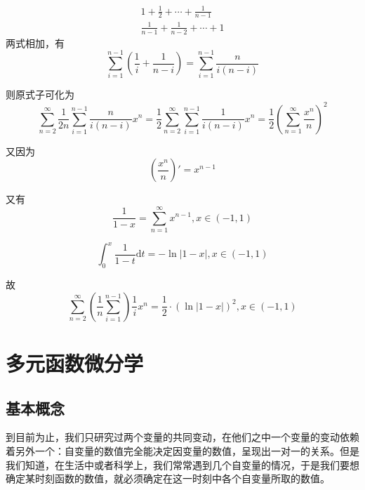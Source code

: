 \documentclass[lang=cn,10pt]{elegantbook}
\begin{document}
		\begin{equation*}
			\begin{split}
				1+\frac{1}{2}+\cdots +\frac{1}{n-1}\\
				\frac{1}{n-1}+\frac{1}{n-2}+\cdots+1
			\end{split}
		\end{equation*}
		两式相加，有
		\begin{equation*}
			\sum_{i=1}^{n-1 }(\frac{1}{i}+\frac{1}{n-i})=\sum_{i=1}^{n-1 }\frac{n}{i(n-i)}
		\end{equation*}
		
		则原式子可化为
		\begin{equation*}
			\sum_{n=2}^{\infty }\frac{1}{2n}\sum_{i=1}^{n-1 }\frac{n}{i(n-i)}x^{n}=\frac{1}{2}\sum_{n=2}^{\infty }\sum_{i=1}^{n-1 }\frac{1}{i(n-i)}x^{n}=\frac{1}{2}(\sum_{n=1}^{\infty }\frac{x^{n}}{n})^{2}
		\end{equation*}
		
		又因为
		\begin{equation*}
			({\frac{x^{n} }{n}})' =x^{n-1}
		\end{equation*}
		
		又有
		\begin{equation*}
			\frac{1}{1-x}=\sum_{n=1}^{\infty }x^{n-1},x \in (-1,1)
		\end{equation*}
		
		\begin{equation*}
			\int_{0}^{x}\frac{1}{1-t}  \mathrm{d}t =-\ln |1-x|, x\in (-1,1)
		\end{equation*}
		
		故
		\begin{equation*}
			\sum_{n=2}^{\infty }(\frac{1}{n}\sum_{i=1}^{n-1})\frac{1}{i}x^{n}=\frac{1}{2}\cdot (\ln |1-x|)^{2}, x\in (-1,1)
		\end{equation*}

\chapter{多元函数微分学}
\section{基本概念}

到目前为止，我们只研究过两个变量的共同变动，在他们之中一个变量的变动依赖着另外一个：自变量的数值完全能决定因变量的数值，呈现出一对一的关系。但是我们知道，在生活中或者科学上，我们常常遇到几个自变量的情况，于是我们要想确定某时刻函数的数值，就必须确定在这一时刻中各个自变量所取的数值。
\end{document}
